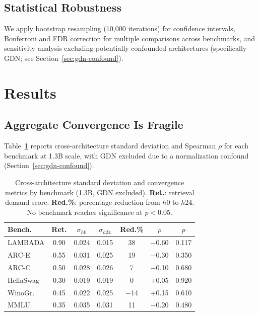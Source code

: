 \documentclass[11pt,a4paper]{article}
\begin{document}
\subsection{Statistical Robustness}

We apply bootstrap resampling (10,000 iterations) for confidence intervals, Bonferroni and FDR correction for multiple comparisons across benchmarks, and sensitivity analysis excluding potentially confounded architectures (specifically GDN; see Section~\ref{sec:gdn-confound}).

\section{Results}
\label{sec:results}

\subsection{Aggregate Convergence Is Fragile}
\label{sec:aggregate}

Table~\ref{tab:aggregate} reports cross-architecture standard deviation and Spearman $\rho$ for each benchmark at 1.3B scale, with GDN excluded due to a normalization confound (Section~\ref{sec:gdn-confound}).

\begin{table}[t]
\centering
\small
\begin{tabular}{lcccccc}
\toprule
\textbf{Bench.} & \textbf{Ret.} & $\sigma_{h0}$ & $\sigma_{h24}$ & \textbf{Red.\%} & $\rho$ & \textbf{$p$} \\
\midrule
LAMBADA  & 0.90 & 0.024 & 0.015 & 38 & $-$0.60 & 0.117 \\
ARC-E    & 0.55 & 0.031 & 0.025 & 19 & $-$0.30 & 0.350 \\
ARC-C    & 0.50 & 0.028 & 0.026 & 7  & $-$0.10 & 0.680 \\
HellaSwag & 0.30 & 0.019 & 0.019 & 0  & +0.05  & 0.920 \\
WinoGr.  & 0.45 & 0.022 & 0.025 & $-$14 & +0.15 & 0.610 \\
MMLU     & 0.35 & 0.035 & 0.031 & 11 & $-$0.20 & 0.480 \\
\bottomrule
\end{tabular}
\caption{Cross-architecture standard deviation and convergence metrics by benchmark (1.3B, GDN excluded). \textbf{Ret.}: retrieval demand score. \textbf{Red.\%}: percentage reduction from $h0$ to $h24$. No benchmark reaches significance at $p < 0.05$.}
\label{tab:aggregate}
\end{table}
\end{document}
